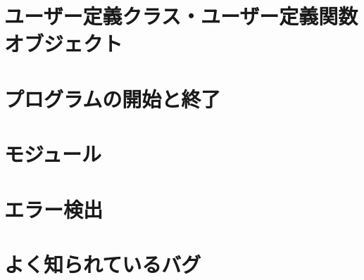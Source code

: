 \documentclass[12pt,a4paper]{jarticle}
\begin{document}


\newpage

\section{ユーザー定義クラス・ユーザー定義関数オブジェクト}
\label{sec:userdefined}



\newpage

\section{プログラムの開始と終了}
\label{sec:initfin}



\newpage

\section{モジュール}
\label{sec:module}



\newpage

\section{エラー検出}
\label{sec:errormessage}



\newpage



\section{よく知られているバグ}
\label{sec:knownbug}


\newpage
\end{document}
